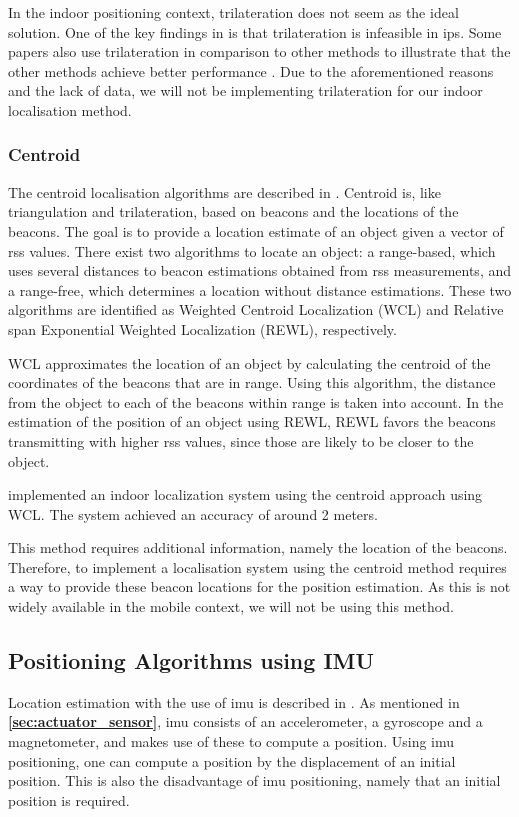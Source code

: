 In the indoor positioning context, trilateration does not seem as the ideal solution\cite{trilateration02}. One of the key findings in \cite{trilateration02} is that trilateration is infeasible in \gls{ips}. Some papers also use trilateration in comparison to other methods to illustrate that the other methods achieve better performance \cite{triangulation03trilat, trilateration01}. Due to the aforementioned reasons and the lack of data, we will not be implementing trilateration for our indoor localisation method.

\subsubsection{Centroid}
The centroid localisation algorithms are described in \cite{5759777}. Centroid is, like triangulation and trilateration, based on beacons and the locations of the beacons. The goal is to provide a location estimate of an object given a vector of \gls{rss} values. There exist two algorithms to locate an object: a range-based, which uses several distances to beacon estimations obtained from \gls{rss} measurements, and a range-free, which determines a location without distance estimations. These two algorithms are identified as  Weighted Centroid Localization (WCL)\cite{5759777} and Relative span Exponential Weighted Localization (REWL)\cite{5759777}, respectively.

WCL approximates the location of an object by calculating the centroid of the coordinates of the beacons that are in range. Using this algorithm, the distance from the object to each of the beacons within range is taken into account.
In the estimation of the position of an object using REWL, REWL favors the beacons transmitting with higher \gls{rss} values, since those are likely to be closer to the object.

\cite{7536951} implemented an indoor localization system using the centroid approach using WCL. The system achieved an accuracy of around 2 meters.

This method requires additional information, namely the location of the beacons. Therefore, to implement a localisation system using the centroid method requires a way to provide these beacon locations for the position estimation. As this is not widely available in the mobile context, we will not be using this method.

\subsection{Positioning Algorithms using IMU} \label{sec:IMUPositioning}
Location estimation with the use of \gls{imu} is described in \cite{IMUPositioning}. As mentioned in \textbf{\autoref{sec:actuator_sensor}}, \gls{imu} consists of an accelerometer, a gyroscope and a magnetometer, and makes use of these to compute a position. Using \gls{imu} positioning, one can compute a position by the displacement of an initial position. This is also the disadvantage of \gls{imu} positioning, namely that an initial position is required.

